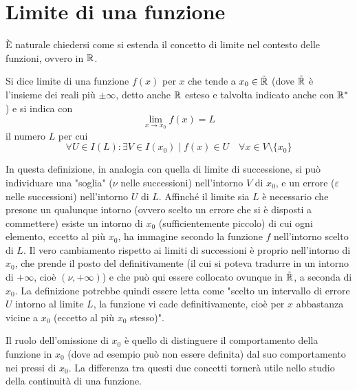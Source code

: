 %
%
%
%


\section{Limite di una funzione}
È naturale chiedersi come si estenda il concetto di limite nel contesto delle funzioni, ovvero in $\mathbb{R}$.
\begin{defin}
	Si dice limite di una funzione $f(x)$ per $x$ che tende a $x_0\in\tilde{\mathbb{R}}$ (dove $\tilde{\mathbb{R}}$ è l'insieme dei reali più $\pm\infty$, detto anche $\mathbb{R}$ esteso e talvolta indicato anche con $\mathbb{R}^*$) e si indica con
	\[
		\lim_{x\to x_0} f(x)=L
	\]
	il numero $L$ per cui
	\[
		\forall U\in I(L): \exists V\in I(x_0)\mid f(x)\in U \quad\forall x\in V\setminus\{x_0\}
	\]
\end{defin}
In questa definizione, in analogia con quella di limite di successione, si può individuare una "soglia" ($\nu$ nelle successioni) nell'intorno $V$ di $x_0$, e un errore ($\varepsilon$ nelle successioni) nell'intorno $U$ di $L$. Affinché il limite sia $L$ è necessario che presone un qualunque intorno (ovvero scelto un errore che si è disposti a commettere) esiste un intorno di $x_0$ (sufficientemente piccolo) di cui ogni elemento, eccetto al più $x_0$, ha immagine secondo la funzione $f$ nell'intorno scelto di $L$. Il vero cambiamento rispetto ai limiti di successioni è proprio nell'intorno di $x_0$, che prende il posto del definitivamente (il cui si poteva tradurre in un intorno di $+\infty$, cioè $(\nu, +\infty)$) e che può qui essere collocato ovunque in $\tilde{\mathbb{R}}$, a seconda di $x_0$. La definizione potrebbe quindi essere letta come "scelto un intervallo di errore $U$ intorno al limite $L$, la funzione vi cade definitivamente, cioè per $x$ abbastanza vicine a $x_0$ (eccetto al più $x_0$ stesso)".

Il ruolo dell'omissione di $x_0$ è quello di distinguere il comportamento della funzione in $x_0$ (dove ad esempio può non essere definita) dal suo comportamento nei pressi di $x_0$. La differenza tra questi due concetti tornerà utile nello studio della continuità di una funzione.

